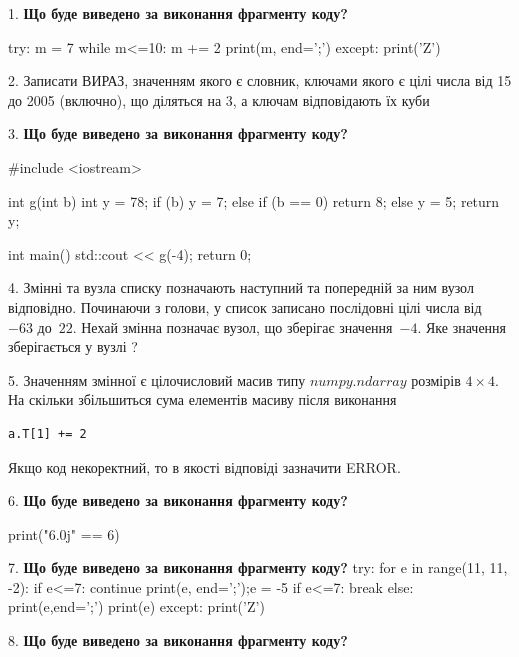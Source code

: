 \documentclass[11pt]{article}
\begin{document}
1. \textbf{Що буде виведено за виконання фрагменту коду?}

try:
    m = 7
    while m<=10:
        m += 2
    print(m, end=';')
except:
    print('Z')

\par\vspace{5mm}
2. 
Записати ВИРАЗ, значенням якого є словник, ключами якого є цілі числа від 15 до 2005 (включно), що діляться на 3, а ключам відповідають їх куби \par\vspace{5mm}
3. \textbf{Що буде виведено за виконання фрагменту коду?}

#include <iostream>

int g(int b){
    int y = 78;
    if (b) 
        y = 7;
    else if (b == 0)
         return 8;
    else
         y = 5;
    return y;
}

int main(){
    std::cout << g(-4);
    return 0;
}

\par\vspace{5mm}
4. 
Змінні  та  вузла списку позначають наступний та попередній за ним вузол відповідно. Починаючи з голови, у список записано послідовні цілі числа від~$-63$ до~$22$. Нехай змінна  позначає вузол, що зберігає значення~$-4$.
Яке значення зберігається у вузлі  ?
\par\vspace{5mm}
5. 
Значенням змінної  є цілочисловий масив типу $numpy.ndarray$ розмірів $4{\times}4$. На скільки збільшиться сума елементів масиву  після виконання
\begin{verbatim}
a.T[1] += 2
\end{verbatim}


Якщо код некоректний, то в якості відповіді зазначити ERROR.


\par\vspace{5mm}
6. \textbf{Що буде виведено за виконання фрагменту коду?}

print("6.0j" == 6)
\par\vspace{5mm}
7. \textbf{Що буде виведено за виконання фрагменту коду?}
try:
    for e in range(11, 11, -2):
        if e<=7:
            continue
        print(e, end=';');e = -5
        if e<=7:
            break
    else:
        print(e,end=';')
    print(e)
except:
    print('Z')
\par\vspace{5mm}
8. \textbf{Що буде виведено за виконання фрагменту коду?}
\end{document}
